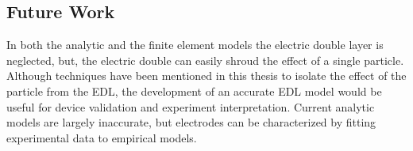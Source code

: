 


\subsection*{Future Work}

\par In both the analytic and the finite element models the electric double layer is neglected, but, the electric double can easily shroud the effect of a single particle. Although techniques have been mentioned in this thesis to isolate the effect of the particle from the EDL, the development of an accurate EDL model would be useful for device validation and experiment interpretation. Current analytic models are largely inaccurate, but electrodes can be characterized by fitting experimental data to empirical models. 


